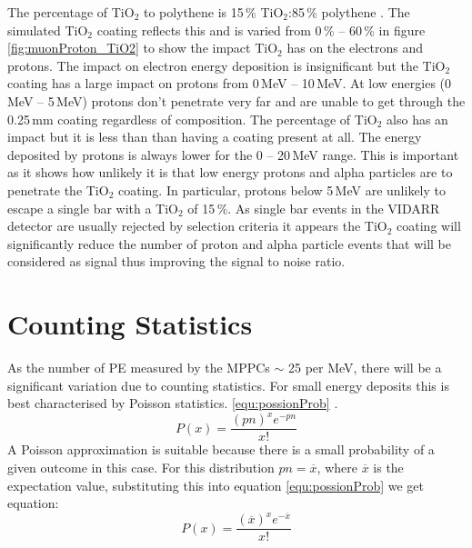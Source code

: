 
The percentage of TiO$_2$ to polythene is 15\,\% TiO$_2$:85\,\% polythene \cite{aliaga2014design} \cite{Pla-Dalmau2014}. The simulated TiO$_2$ coating reflects this and is varied from 0\,\% -- 60\,\% in figure \ref{fig:muonProton_TiO2} to show the impact TiO$_2$ has on the electrons and protons. The impact on electron energy deposition is insignificant but the TiO$_2$ coating has a large impact on protons from 0\,MeV -- 10\,MeV. At low energies (0\,MeV -- 5\,MeV) protons don't penetrate very far and are unable to get through the 0.25\,mm coating regardless of composition. The percentage of TiO$_2$ also has an impact but it is less than than having a coating present at all. The energy deposited by protons is always lower for the 0 -- 20\,MeV range. This is important as it shows how unlikely it is that low energy protons and alpha particles are to penetrate the TiO$_2$ coating. In particular, protons below 5\,MeV are unlikely to escape a single bar with a TiO$_2$ of 15\,\%. As single bar events in the VIDARR detector are usually rejected by selection criteria it appears the TiO$_2$ coating will significantly reduce the number of proton and alpha particle events that will be considered as signal thus improving the signal to noise ratio. 

\section{Counting Statistics} \label{sec:GEANT4Simulation_countingStats}
As the number of PE measured by the MPPCs $\sim$ 25 per MeV, there will be a significant variation due to counting statistics. For small energy deposits this is best characterised by Poisson statistics. \ref{equ:possionProb} \cite{knoll_2010}.
\begin{equation}
P(x) = \frac{(pn)^x e^{-pn}}{x!}  
\label{equ:possionProb}
\end{equation}
A Poisson approximation is suitable because there is a small probability of a given outcome in this case. For this distribution $pn = \overline{x}$, where $\overline{x}$ is the expectation value, substituting this into equation \ref{equ:possionProb} we get equation: 
\begin{equation}
P(x) = \frac{(\overline{x})^x e^{-\overline{x}}}{x!}  
\label{equ:possionExpectation}
\end{equation}

